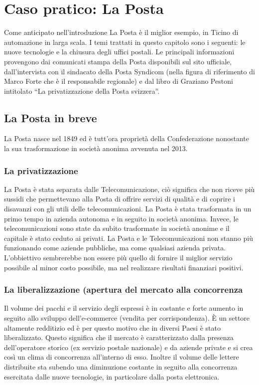 \section{Caso pratico: La Posta}
Come anticipato nell’introduzione La Posta è il miglior esempio, in Ticino di automazione in larga scala. I temi trattati in questo capitolo sono i seguenti: le nuove tecnologie e la chiusura degli uffici postali. Le principali informazioni provengono dai comunicati stampa della Posta disponibili sul sito ufficiale, dall’intervista con il sindacato della Posta Syndicom (nella figura di riferimento di Marco Forte che è il responsabile regionale) e dal libro di Graziano Pestoni intitolato “La privatizzazione della Posta svizzera”.

\subsection{La Posta in breve}
La Posta nasce nel 1849 ed è tutt’ora proprietà della Confederazione nonostante la sua trasformazione in società anonima avvenuta nel 2013.

\subsubsection{La privatizzazione}
La Posta è stata separata dalle Telecomunicazione, ciò significa che non riceve più sussidi che permettevano alla Posta di offrire servizi di qualità e di coprire i disavanzi con gli utili delle telecomunicazioni. La Posta è stata trasformata in un primo tempo in azienda autonoma e in seguito in società anonima. Invece, le telecomunicazioni sono state da subito trasformate in società anonime e il capitale è stato ceduto ai privati.
La Posta e le Telecomunicazioni non stanno più funzionando come aziende pubbliche, ma come qualsiasi azienda privata. L’obbiettivo sembrerebbe non essere più quello di fornire il miglior servizio possibile al minor costo possibile, ma nel realizzare risultati finanziari positivi.

\subsubsection{La liberalizzazione (apertura del mercato alla concorrenza}
Il volume dei pacchi e il servizio degli espressi è in costante e forte aumento in seguito allo sviluppo dell’e-commerce (vendita per corrispondenza). È un settore altamente redditizio ed è per questo motivo che in diversi Paesi è stato liberalizzato. Questo significa che il mercato è caratterizzato dalla presenza dell’operatore storico (ex servizio postale nazionale) e da aziende private e si crea così un clima di concorrenza all’interno di esso. Inoltre il volume delle lettere distribuite sta subendo una diminuzione costante in seguito alla concorrenza esercitata dalle nuove tecnologie, in particolare dalla posta elettronica.
